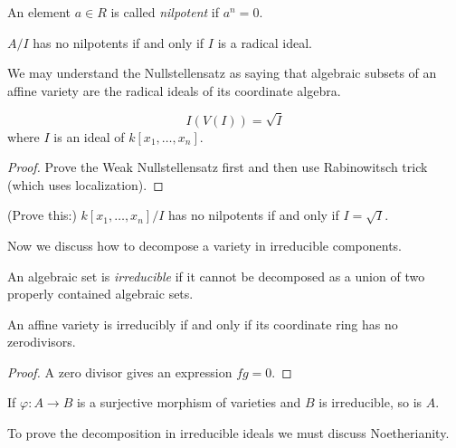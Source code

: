 \begin{definition}
\label{definition-nilpotent}
An element $a \in R$ is called {\it
nilpotent}
if $a^n = 0$.
\end{definition}

\begin{exercise}
\label{exercise-no-nilpotents-iff-radical}
$A/I$ has no nilpotents if and only if $I$ is
a radical ideal.
\end{exercise}

\noindent
We may understand the Nullstellensatz
as saying that algebraic subsets of an affine
variety
are the radical ideals of its coordinate
algebra.

\begin{theorem}[Nullstellensatz]
\label{theorem-nullstellensatz}
$$
I(V(I))=\sqrt{I}
$$
where $I$ is an ideal of $k[x_1,…,x_n]$.
\end{theorem}

\begin{proof}
Prove the Weak Nullstellensatz first
and then use Rabinowitsch trick
(which uses localization).
\end{proof}

\noindent
(Prove this:)
$k[x_1,…,x_n]/I$ has no nilpotents if and
only if
$I = \sqrt{I}$.

\medskip\noindent
Now we discuss how to decompose a variety in
irreducible components.

\begin{definition}
\label{definition-irreducible-variety}
An algebraic set is {\it irreducible}
if it cannot be decomposed as a union of two
properly
contained algebraic sets.
\end{definition}

\begin{lemma}
\label{lemma-irred-iff-coord-ring-reduc}
An affine variety is irreducibly if and only
if
its coordinate ring has no zerodivisors.
\end{lemma}

\begin{proof}
A zero divisor gives an expression $fg=0$.
\end{proof}

\begin{exercise}
\label{exercise-surje-map-irred-varie}
If $\varphi:A \to B$ is a surjective morphism
of varieties
and $B$ is irreducible, so is $A$.
\end{exercise}


To prove the decomposition in
irreducible ideals we must discuss
Noetherianity.

